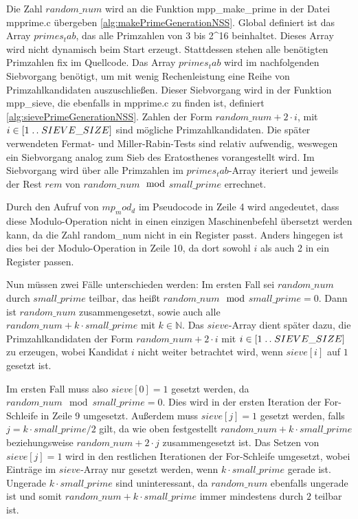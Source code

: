 Die Zahl $random\_num$ wird an die Funktion mpp_make_prime in der Datei mpprime.c übergeben \ref{alg:makePrimeGenerationNSS}.
Global definiert ist das Array $primes_tab$, das alle Primzahlen von 3 bis 2^16 beinhaltet. Dieses Array wird nicht dynamisch beim Start erzeugt.
Stattdessen stehen alle benötigten Primzahlen fix im Quellcode. 
Das Array $primes_tab$ wird im nachfolgenden Siebvorgang benötigt, um mit wenig Rechenleistung eine Reihe von Primzahlkandidaten auszuschließen.
Dieser Siebvorgang wird in der Funktion mpp_sieve, die ebenfalls in mpprime.c zu finden ist, definiert \ref{alg:sievePrimeGenerationNSS}.
Zahlen der Form $random\_num + 2 \cdot i$, mit $i \in [1\mathrel{{.}\,{.}}\nobreak SIEVE\_SIZE]$ sind mögliche Primzahlkandidaten.
Die später verwendeten Fermat- und Miller-Rabin-Tests sind relativ aufwendig, weswegen ein Siebvorgang analog zum Sieb des Eratosthenes vorangestellt wird.
Im Siebvorgang wird über alle Primzahlen im $primes_tab$-Array iteriert und jeweils der Rest $rem$ von $random\_num$$\mod$$small\_prime$ errechnet.

Durch den Aufruf von $mp_mod_d$ im Pseudocode in Zeile 4 wird angedeutet, dass diese Modulo-Operation nicht in einen einzigen Maschinenbefehl übersetzt werden kann, da die Zahl random\_num nicht in ein Register passt. Anders hingegen ist dies bei der Modulo-Operation in Zeile 10, da dort sowohl $i$ als auch 2 in ein Register passen.

Nun müssen zwei Fälle unterschieden werden:
Im ersten Fall sei $random\_num$ durch $small\_prime$ teilbar, das heißt $random\_num$$\mod$$small\_prime = 0$.
Dann ist $random\_num$ zusammengesetzt, sowie auch alle $random\_num + k \cdot small\_prime$ mit $k \in \mathbb{N}$.
Das $sieve$-Array dient später dazu, die Primzahlkandidaten der Form $random\_num + 2 \cdot i$ mit $i \in [1\mathrel{{.}\,{.}}\nobreak SIEVE\_SIZE]$ zu erzeugen, wobei Kandidat $i$ nicht weiter betrachtet wird, wenn $sieve[i]$ auf $1$ gesetzt ist.

Im ersten Fall muss also $sieve[0] = 1$ gesetzt werden, da $random\_num \mod small\_prime = 0$.
Dies wird in der ersten Iteration der For-Schleife in Zeile 9 umgesetzt.
Außerdem muss $sieve[j] = 1$ gesetzt werden, falls $j = k \cdot small\_prime / 2$ gilt, da wie oben festgestellt $random\_num + k \cdot small\_prime$ beziehungsweise $random\_num + 2 \cdot j$ zusammengesetzt ist.
Das Setzen von $sieve[j] = 1$ wird in den restlichen Iterationen der For-Schleife umgesetzt, wobei Einträge im $sieve$-Array nur gesetzt werden, wenn $k \cdot small\_prime$ gerade ist.
Ungerade $k \cdot small\_prime$ sind uninteressant, da $random\_num$ ebenfalls ungerade ist und somit $random\_num + k \cdot small\_prime$ immer mindestens durch $2$ teilbar ist.

